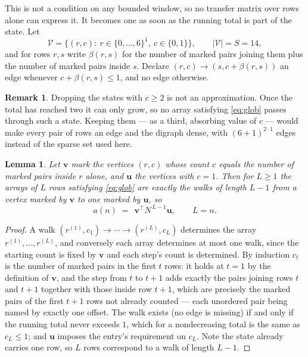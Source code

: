 \documentclass[11pt,a4paper]{article}
\theoremstyle{plain}
\newtheorem{lemma}[theorem]{Lemma}
\theoremstyle{definition}
\newtheorem{remark}[theorem]{Remark}
\begin{document}
This is not a condition on any bounded window, so no transfer matrix over rows alone can
express it. It becomes one as soon as the running total is part of the state. Let
\[
\mathcal V=\bigl\{(r,c):\ r\in\{0,\dots,6\}^{1},\ c\in\{0,1\}\bigr\},
\qquad |\mathcal V|=S=14,
\]
and for rows $r,s$ write $\beta(r,s)$ for the number of marked pairs joining them plus the
number of marked pairs inside $s$. Declare $(r,c)\to(s,c+\beta(r,s))$ an edge whenever
$c+\beta(r,s)\le1$, and no edge otherwise.

\begin{remark}
Dropping the states with $c\ge2$ is not an approximation. Once the total has reached two it
can only grow, so no array satisfying \eqref{eq:glob} passes through such a state. Keeping
them --- as a third, absorbing value of $c$ --- would make every pair of rows an edge and
the digraph dense, with $(6+1)^{2\cdot1}$ edges instead of the sparse set used here.
\end{remark}

\begin{lemma}\label{lem:walk}
Let $\mathbf{v}$ mark the vertices $(r,c)$ whose count $c$ equals the number of marked pairs
inside $r$ alone, and $\mathbf{u}$ the vertices with $c=1$. Then for $L\ge1$ the arrays
of $L$ rows satisfying \eqref{eq:glob} are exactly the walks of length $L-1$ from a
vertex marked by $\mathbf{v}$ to one marked by $\mathbf{u}$, so
\[
a(n)\;=\;\,\mathbf{v}^{\!\top}N^{\,L-1}\mathbf{u},\qquad L=n .
\]
\end{lemma}

\begin{proof}
A walk $(r^{(1)},c_1)\to\cdots\to(r^{(L)},c_L)$ determines the array
$r^{(1)},\dots,r^{(L)}$, and conversely each array determines at most one walk, since the
starting count is fixed by $\mathbf{v}$ and each step's count is determined. By induction
$c_t$ is the number of marked pairs in the first $t$ rows: it holds at $t=1$ by the
definition of $\mathbf{v}$, and the step from $t$ to $t+1$ adds exactly the pairs joining
rows $t$ and $t+1$ together with those inside row $t+1$, which are precisely the marked
pairs of the first $t+1$ rows not already counted --- each unordered pair being named by
exactly one offset. The walk exists (no edge is missing) if and only if the running total
never exceeds $1$, which for a nondecreasing total is the same as $c_L\le1$; and
$\mathbf{u}$ imposes the entry's requirement on $c_L$. Note the state already carries one
row, so $L$ rows correspond to a walk of length $L-1$.
\end{proof}
\end{document}
